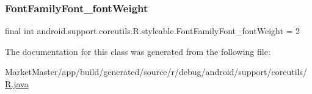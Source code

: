 \mbox{\label{classandroid_1_1support_1_1coreutils_1_1R_1_1styleable_a08ae17280f865bcf7bb8a223b10003cd}} 
\subsubsection{\texorpdfstring{Font\+Family\+Font\+\_\+font\+Weight}{FontFamilyFont\_fontWeight}}
{\footnotesize\ttfamily final int android.\+support.\+coreutils.\+R.\+styleable.\+Font\+Family\+Font\+\_\+font\+Weight = 2\hspace{0.3cm}{\ttfamily [static]}}



The documentation for this class was generated from the following file\+:\begin{DoxyCompactItemize}
\item 
Market\+Master/app/build/generated/source/r/debug/android/support/coreutils/\mbox{\hyperlink{debug_2android_2support_2coreutils_2R_8java}{R.\+java}}\end{DoxyCompactItemize}
